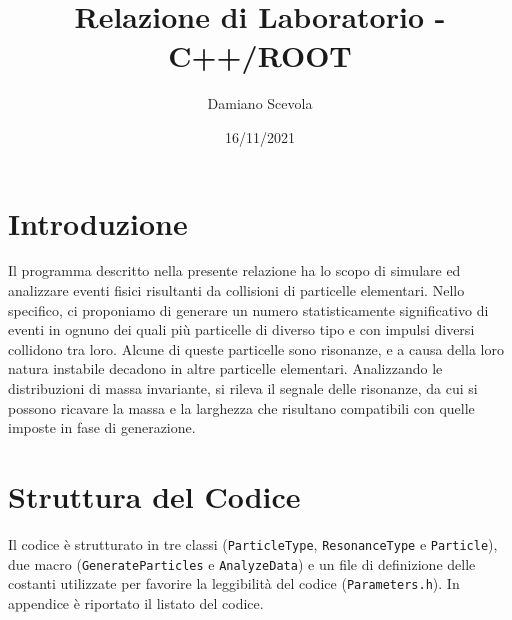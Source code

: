 \documentclass{article}
\title{Relazione di Laboratorio - C++/ROOT}
\author{Damiano Scevola}
\date{16/11/2021}
\begin{document}
\maketitle

\section{Introduzione}
Il programma descritto nella presente relazione ha lo scopo di simulare ed analizzare eventi fisici risultanti da collisioni di particelle elementari. Nello specifico, ci proponiamo di generare un numero statisticamente significativo di eventi in ognuno dei quali più particelle di diverso tipo e con impulsi diversi collidono tra loro. Alcune di queste particelle sono risonanze, e a causa della loro natura instabile decadono in altre particelle elementari. Analizzando le distribuzioni di massa invariante, si rileva il segnale delle risonanze, da cui si possono ricavare la massa e la larghezza che risultano compatibili con quelle imposte in fase di generazione.

\section{Struttura del Codice}
Il codice è strutturato in tre classi (\texttt{ParticleType}, \texttt{ResonanceType} e \texttt{Particle}), due macro (\texttt{GenerateParticles} e \texttt{AnalyzeData}) e un file di definizione delle costanti utilizzate per favorire la leggibilità del codice (\texttt{Parameters.h}). In appendice è riportato il listato del codice.
\end{document}
